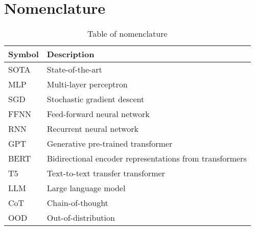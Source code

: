 \chapter{Nomenclature}\label{app:nomenclature}

\begin{table}[H]
    \centering
    \begin{tabular}{ll}
        \toprule
        \textbf{Symbol} & \textbf{Description}                                    \\
        \midrule
        SOTA            & State-of-the-art                                        \\
        MLP             & Multi-layer perceptron                                  \\
        SGD             & Stochastic gradient descent                             \\
        FFNN            & Feed-forward neural network                             \\
        RNN             & Recurrent neural network                                \\
        GPT             & Generative pre-trained transformer                      \\
        BERT            & Bidirectional encoder representations from transformers \\
        T5              & Text-to-text transfer transformer                       \\
        LLM             & Large language model                                    \\
        CoT             & Chain-of-thought                                        \\
        OOD             & Out-of-distribution                                     \\
        \bottomrule
    \end{tabular}
    \caption{Table of nomenclature}
    \label{tab:nomenclature}
\end{table}